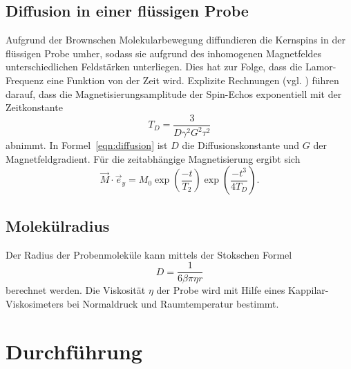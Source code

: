\subsection{Diffusion in einer flüssigen Probe}
Aufgrund der Brownschen Molekularbewegung diffundieren die
Kernspins in der flüssigen Probe umher, sodass sie aufgrund des inhomogenen
Magnetfeldes unterschiedlichen Feldstärken unterliegen.
Dies hat zur Folge, dass die Lamor-Frequenz eine Funktion von der Zeit wird.
Explizite Rechnungen (vgl. \cite{anleitung}) führen darauf, dass die Magnetisierungsamplitude
der Spin-Echos exponentiell mit der Zeitkonstante
\begin{equation}
  \label{eqn:diffusion}
  T_{D} = \frac{3}{D\gamma^2G^2\tau^2}
\end{equation}
abnimmt.
In Formel~\eqref{eqn:diffusion} ist $D$ die Diffusionskonstante und $G$
der Magnetfeldgradient.
Für die zeitabhängige Magnetisierung ergibt sich
\begin{equation}
  \label{eqn:mag_diffusion}
  \vec{M}\cdot\vec{e}_y = M_0\exp{\left(\frac{-t}{T_2}\right)}\exp{\left(\frac{-t^3}{4T_{D}}\right)}.
\end{equation}

\subsection{Molekülradius}
Der Radius der Probenmoleküle kann mittels der Stokschen Formel
\begin{equation}
  \label{eqn:diffkonst}
  D = \frac{1}{6\beta\pi\eta r}
\end{equation}
berechnet werden. Die Viskosität $\eta$ der Probe wird mit Hilfe eines Kappilar-Viskosimeters
bei Normaldruck und Raumtemperatur bestimmt.

\section{Durchführung}
